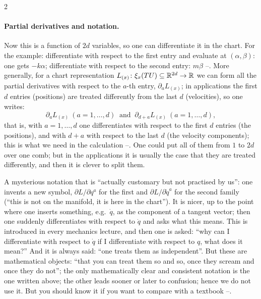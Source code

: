 \begin{paracol}{2}
\paragraph{Partial derivatives and notation.} Now this is a function of $2d$ variables, so one can differentiate it in the chart. For the example: differentiate with respect to the first entry and evaluate at $(\alpha,\beta)$: one gets $-k\alpha$; differentiate with respect to the second entry: $m\beta$ --. More generally, for a chart representation $L_{(x)}\colon\xi_x(TU)\subseteq\mathbb{R}^{2d}\to\mathbb{R}$ we can form all the partial derivatives with respect to the $a$-th entry, $\partial_aL_{(x)}$; in applications the first $d$ entries (positions) are treated differently from the last $d$ (velocities), so one writes:
\begin{equation}\label{eq:lag-partials}
  \partial_aL_{(x)}\ (a=1,\dots,d)\ \text{ and }\ \partial_{d+a}L_{(x)}\ (a=1,\dots,d),
\end{equation}
that is, with $a=1,\dots,d$ one differentiates with respect to the first $d$ entries (the positions), and with $d+a$ with respect to the last $d$ (the velocity components); this is what we need in the calculation --. One could put all of them from $1$ to $2d$ over one comb; but in the applications it is usually the case that they are treated differently, and then it is clever to split them.

\begin{coursenote}\label{cn:lag-notation}
A mysterious notation that is ``actually customary but not practised by us'': one invents a new symbol, $\partial L/\partial q^a$ for the first and $\partial L/\partial\dot q^a$ for the second family (``this is not on the manifold, it is here in the chart''). It is nicer, up to the point where one inserts something, e.g.\ $\dot q$, as the component of a tangent vector; then one suddenly differentiates with respect to $\dot q$ and asks what this means. This is introduced in every mechanics lecture, and then one is asked: ``why can I differentiate with respect to $\dot q$ if I differentiate with respect to $q$, what does it mean?'' And it is always said: ``one treats them as independent''.
But these are mathematical objects: ``that you can treat them so and so, once they scream and once they do not''; the only mathematically clear and consistent notation is the one written above; the other leads sooner or later to confusion; hence we do not use it. But you should know it if you want to compare with a textbook --.
\end{coursenote}


\end{paracol}
